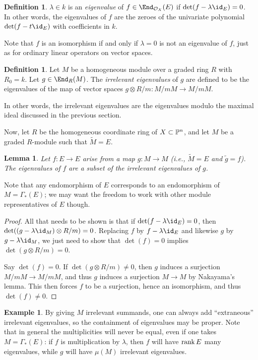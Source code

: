 \documentclass[12pt]{article}
\let\l\lambda
\let\wtilde\widetilde
\def\OO{\mathcal O}
\theoremstyle{theorem}
\numberwithin{thm}{section}
\newtheorem{lem}[thm]{Lemma}
\theoremstyle{definition}
\newtheorem{dfn}[thm]{Definition}
\newtheorem{exa}[thm]{Example}
\def\defn#1{{\it #1}}
\begin{document}
\begin{dfn}
$\l \in k$ is an \defn{eigenvalue} of $f \in \End_{\OO_X}(E)$ if $\det(f-\l \id_E)= 0$. In other words, the eigenvalues of $f$ are the zeroes of the univariate polynomial $\det(f-t\id _E)$ with coefficients in $k$.
\end{dfn}

Note that $f$ is an isomorphism if and only if $\l=0$ is not an eigenvalue of $f$, just as for ordinary linear operators on vector spaces.

\begin{dfn}
Let $M$ be a homogeneous module over a graded ring $R$ with $R_0=k$.
Let $g \in \End_R(M)$. The \defn{irrelevant eigenvalues} of $g$ are defined to be the eigenvalues of the map of vector spaces $g\otimes R/m:M/mM \to M/mM$.
\end{dfn}

In other words, the irrelevant eigenvalues are the eigenvalues modulo the maximal ideal discussed in the previous section.


Now, let $R$ be the homogeneous coordinate ring of $X\subset \P^n$, and let $M$ be a graded $R$-module such that $\wtilde M=E$.

\begin{lem}
Let $f:E\to E$ arise from a map $g:M\to M$ (i.e., $\wtilde M = E$ and $\wtilde g = f$).
The eigenvalues of $f$ are a subset of the irrelevant eigenvalues of $g$.
\end{lem}

Note that any endomorphism of $E$ corresponds to an endomorphism of $M=\Gamma_*(E)$; we may want the freedom to work with other module representatives of $E$ though.

\begin{proof}
  All that needs to be shown is that if $\det(f-\l \id_E) =0$, then $\det((g-\l \id_M)\otimes R/m)=0$.
Replacing $f$ by $f-\l \id_E$ and likewise $g$ by $g-\l\id_M$, we just need to show that $\det(f)=0$ implies $\det(g\otimes R/m)=0$.

Say $\det(f)=0$.
If $\det(g\otimes R/m)\neq 0$, then $g$ induces a surjection $M/mM\to M/mM$, and thus $g$ induces a surjection $M\to M$ by Nakayama's lemma. This then forces $f$ to be a surjection, hence an isomorphism, and thus $\det(f)\neq 0$.
\end{proof}

\begin{exa}
By giving $M$ irrelevant summands, one can always add ``extraneous'' irrelevant eigenvalues, so the containment of eigenvalues may be proper.
Note that in general the multiplicities will never be equal, even if one takes $M=\Gamma_*(E)$: if $f$ is multiplication by $\l$, then $f$ will have $\rank E$ many eigenvalues, while $g$ will have $\mu(M)$ irrelevant eigenvalues.
\end{exa}
\end{document}
